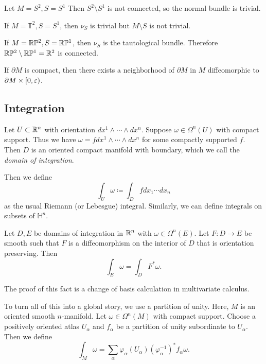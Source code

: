 \documentclass[twoside, 10pt]{article}
\renewcommand{\H}{\mathbb{H}}
\begin{document}
    \begin{exm}
        Let $M = S^2, S = S^1$ Then $S^2 \setminus S^1$ is not connected, so the normal bundle is trivial.
    \end{exm}

    \begin{exm}
        If $M = \mathbb{T}^2, S = S^1$, then $\nu_S$ is trivial but $M \setminus S$ is not trivial.
    \end{exm}

    \begin{exm}
        If $M = \mathbb{R}\mathbb{P}^2, S = \mathbb{R}\mathbb{P}^1$, then $\nu_S$ is the tautological bundle. Therefore $\mathbb{R}\mathbb{P}^2 \setminus \mathbb{R}\mathbb{P}^1 = \mathbb{R}^2$ is connected.
    \end{exm}

    \begin{thm}
        If $\partial M$ is compact, then there exists a neighborhood of $\partial M$ in $M$ diffeomorphic to $\partial M \times [0,\varepsilon)$.
    \end{thm}

    \subsection{Integration}%
    \label{sub:integration}
    
    Let $U \subset \mathbb{R}^n$ with orientation $dx^1 \wedge \cdots \wedge dx^n$. Suppose $\omega \in \Omega^n(U)$ with compact support. Thus we have $\omega = f dx^1 \wedge \cdots \wedge dx^n$ for some compactly supported $f$. Then $D$ is an oriented compact manifold with boundary, which we call the \textit{domain of integration}.

    Then we define
    \[ \int_U \omega \coloneqq \int_D f dx_1 \cdots dx_n\]
    as the usual Riemann (or Lebesgue) integral. Similarly, we can define integrals on subsets of $\H^n$.

    \begin{prop}
        Let $D,E$ be domains of integration in $\mathbb{R}^n$ with $\omega \in \Omega^n(E)$. Let $F:D \to E$ be smooth such that $F$ is a diffeomorphism on the interior of $D$ that is orientation preserving. Then
        \[ \int_E \omega = \int_D F^*\omega.\]
    \end{prop}

    The proof of this fact is a change of basis calculation in multivariate calculus.

    To turn all of this into a global story, we use a partition of unity. Here, $M$ is an oriented smooth $n$-manifold. Let $\omega \in \Omega^n(M)$ with compact support. Choose a positively oriented atlas $U_{\alpha}$ and $f_{\alpha}$ be a partition of unity subordinate to $U_{\alpha}$. Then we define
    \[ \int_M \omega = \sum_{\alpha} \varphi_{\alpha}(U_{\alpha}) (\varphi_{\alpha}^{-1})^* f_{\alpha} \omega.\]
\end{document}
